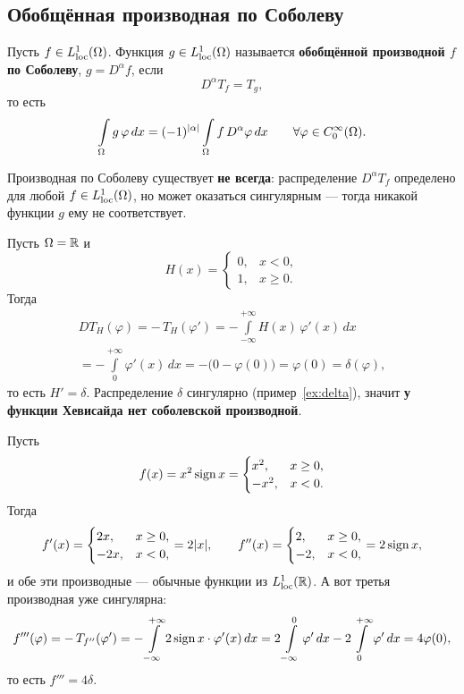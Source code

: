 \subsection{Обобщённая производная по Соболеву}

\begin{definition}\label{def:sobolev-deriv}
Пусть $f \in L^1_{\mathrm{loc}}(\Omega)$. Функция $g \in L^1_{\mathrm{loc}}(\Omega)$ называется \textbf{обобщённой
производной $f$ по Соболеву}, $g = D^\alpha f$, если
\[
  D^\alpha T_f = T_g ,
\]
то есть
\[
  \int\limits_\Omega g\,\varphi\, dx = (-1)^{|\alpha|} \int\limits_\Omega f\, D^\alpha \varphi\, dx
  \qquad \forall \varphi \in C_0^\infty(\Omega) .
\]
\end{definition}

\begin{remark}
Производная по Соболеву существует \textbf{не всегда}: распределение $D^\alpha T_f$
определено для любой $f \in L^1_{\mathrm{loc}}(\Omega)$, но может оказаться сингулярным — тогда
никакой функции $g$ ему не соответствует.
\end{remark}


\begin{example}\label{ex:heaviside}
Пусть $\Omega = \mathbb{R}$ и
\[
  H(x) = \begin{cases} 0, & x < 0, \\ 1, & x \ge 0. \end{cases}
\]
Тогда
\begin{multline*}
  D T_H(\varphi) = -\,T_H(\varphi')
  = -\int\limits_{-\infty}^{+\infty} H(x)\,\varphi'(x)\, dx \\
  = -\int\limits_0^{+\infty} \varphi'(x)\, dx
  = -\big(0 - \varphi(0)\big) = \varphi(0) = \delta(\varphi) ,
\end{multline*}
то есть $H' = \delta$. Распределение $\delta$ сингулярно (пример~\ref{ex:delta}),
значит \textbf{у функции Хевисайда нет соболевской производной}.
\end{example}

\begin{example}\label{ex:x2sign}
Пусть
\[
  f(x) = x^2 \operatorname{sign} x = \begin{cases} x^2, & x \ge 0, \\ -x^2, & x < 0. \end{cases}
\]
Тогда
\[
  f'(x) = \begin{cases} 2x, & x \ge 0, \\ -2x, & x < 0, \end{cases} = 2|x| ,
  \qquad
  f''(x) = \begin{cases} 2, & x \ge 0, \\ -2, & x < 0, \end{cases} = 2\operatorname{sign} x ,
\]
и обе эти производные — обычные функции из $L^1_{\mathrm{loc}}(\mathbb{R})$. А вот третья производная уже
сингулярна:
\[
  f'''(\varphi) = -\,T_{f''}(\varphi') = -\int\limits_{-\infty}^{+\infty} 2\operatorname{sign} x \cdot \varphi'(x)\, dx
  = 2\int\limits_{-\infty}^{0}\varphi'\,dx - 2\int\limits_0^{+\infty}\varphi'\,dx
  = 4\varphi(0) ,
\]
то есть $f''' = 4\delta$.
\end{example}

